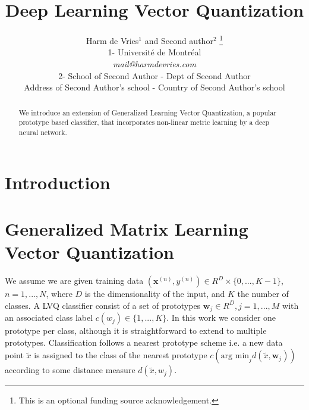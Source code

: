\documentclass{esannV2}
\begin{document}
\title{Deep Learning Vector Quantization}

\author{Harm de Vries$^1$ and Second author$^2$
%
\thanks{This is an optional funding source acknowledgement.}
%
\vspace{.3cm}\\
%
1- Universit\'{e} de Montr\'{e}al \\
\textit{mail@harmdevries.com}
%
\vspace{.1cm}\\
2- School of Second Author - Dept of Second Author \\
Address of Second Author's school - Country of Second Author's school\\
}

\maketitle

\begin{abstract}
We introduce an extension of Generalized Learning Vector Quantization, a popular prototype based classifier, that incorporates non-linear metric learning by a deep neural network. 
\end{abstract}

\section{Introduction}

\section{Generalized Matrix Learning Vector Quantization}
We assume we are given training data $(\mathbf{x}^{(n)}, y^{(n)}) \in R^D \times \{0, ..., K-1\}$, $n=1, ..., N$, where $D$ is the dimensionality of the input, and $K$ the number of classes. A LVQ classifier consist of a set of prototypes ${\mathbf{w}_j} \in R^D, j=1, ..., M$ with an associated class label $c(w_j) \in \{1, ..., K\}$. In this work we consider one prototype per class, although it is straightforward to extend to multiple prototypes. Classification follows a nearest prototype scheme i.e. a new data point $\tilde{x}$ is assigned to the class of the nearest prototype $c(\mbox{arg min}_j d(\tilde{x}, \mathbf{w}_j))$ according to some distance measure $d(\tilde{x}, w_j)$. 
\end{document}
